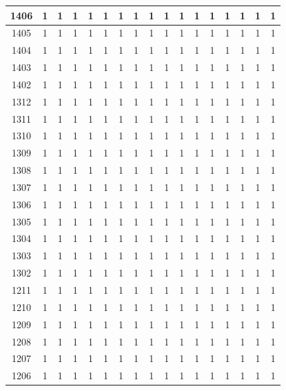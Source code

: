 \begin{itemize}
\begin{longtable}[c]{|c|c|c|c|c|c|c|c|c|c|c|c|c|c|c|c|c|}
1406 & 1 & 1 & 1 & 1 & 1 & 1 & 1 & 1 & 1 & 1 & 1 & 1 & 1 & 1 & 1 & 1 \\ \hline
1405 & 1 & 1 & 1 & 1 & 1 & 1 & 1 & 1 & 1 & 1 & 1 & 1 & 1 & 1 & 1 & 1 \\ \hline
1404 & 1 & 1 & 1 & 1 & 1 & 1 & 1 & 1 & 1 & 1 & 1 & 1 & 1 & 1 & 1 & 1 \\ \hline
1403 & 1 & 1 & 1 & 1 & 1 & 1 & 1 & 1 & 1 & 1 & 1 & 1 & 1 & 1 & 1 & 1 \\ \hline
1402 & 1 & 1 & 1 & 1 & 1 & 1 & 1 & 1 & 1 & 1 & 1 & 1 & 1 & 1 & 1 & 1 \\ \hline
1312 & 1 & 1 & 1 & 1 & 1 & 1 & 1 & 1 & 1 & 1 & 1 & 1 & 1 & 1 & 1 & 1 \\ \hline
1311 & 1 & 1 & 1 & 1 & 1 & 1 & 1 & 1 & 1 & 1 & 1 & 1 & 1 & 1 & 1 & 1 \\ \hline
1310 & 1 & 1 & 1 & 1 & 1 & 1 & 1 & 1 & 1 & 1 & 1 & 1 & 1 & 1 & 1 & 1 \\ \hline
1309 & 1 & 1 & 1 & 1 & 1 & 1 & 1 & 1 & 1 & 1 & 1 & 1 & 1 & 1 & 1 & 1 \\ \hline
1308 & 1 & 1 & 1 & 1 & 1 & 1 & 1 & 1 & 1 & 1 & 1 & 1 & 1 & 1 & 1 & 1 \\ \hline
1307 & 1 & 1 & 1 & 1 & 1 & 1 & 1 & 1 & 1 & 1 & 1 & 1 & 1 & 1 & 1 & 1 \\ \hline
1306 & 1 & 1 & 1 & 1 & 1 & 1 & 1 & 1 & 1 & 1 & 1 & 1 & 1 & 1 & 1 & 1 \\ \hline
1305 & 1 & 1 & 1 & 1 & 1 & 1 & 1 & 1 & 1 & 1 & 1 & 1 & 1 & 1 & 1 & 1 \\ \hline
1304 & 1 & 1 & 1 & 1 & 1 & 1 & 1 & 1 & 1 & 1 & 1 & 1 & 1 & 1 & 1 & 1 \\ \hline
1303 & 1 & 1 & 1 & 1 & 1 & 1 & 1 & 1 & 1 & 1 & 1 & 1 & 1 & 1 & 1 & 1 \\ \hline
1302 & 1 & 1 & 1 & 1 & 1 & 1 & 1 & 1 & 1 & 1 & 1 & 1 & 1 & 1 & 1 & 1 \\ \hline
1211 & 1 & 1 & 1 & 1 & 1 & 1 & 1 & 1 & 1 & 1 & 1 & 1 & 1 & 1 & 1 & 1 \\ \hline
1210 & 1 & 1 & 1 & 1 & 1 & 1 & 1 & 1 & 1 & 1 & 1 & 1 & 1 & 1 & 1 & 1 \\ \hline
1209 & 1 & 1 & 1 & 1 & 1 & 1 & 1 & 1 & 1 & 1 & 1 & 1 & 1 & 1 & 1 & 1 \\ \hline
1208 & 1 & 1 & 1 & 1 & 1 & 1 & 1 & 1 & 1 & 1 & 1 & 1 & 1 & 1 & 1 & 1 \\ \hline
1207 & 1 & 1 & 1 & 1 & 1 & 1 & 1 & 1 & 1 & 1 & 1 & 1 & 1 & 1 & 1 & 1 \\ \hline
1206 & 1 & 1 & 1 & 1 & 1 & 1 & 1 & 1 & 1 & 1 & 1 & 1 & 1 & 1 & 1 & 1 \\ \hline

\end{longtable}
\end{itemize}
